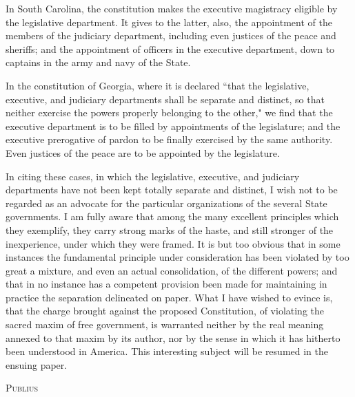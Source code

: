 In South Carolina, the constitution makes the executive magistracy eligible by the legislative department. 
It gives to the latter, also, the appointment of the members of the judiciary department, including even justices of the peace and sheriffs; and the appointment of officers in the executive department, down to captains in the army and navy of the State.

In the constitution of Georgia, where it is declared ``that the legislative, executive, and judiciary departments shall be separate and distinct, so that neither exercise the powers properly belonging to the other," we find that the executive department is to be filled by appointments of the legislature; and the executive prerogative of pardon to be finally exercised by the same authority. 
Even justices of the peace are to be appointed by the legislature.

In citing these cases, in which the legislative, executive, and judiciary departments have not been kept totally separate and distinct, I wish not to be regarded as an advocate for the particular organizations of the several State governments. 
I am fully aware that among the many excellent principles which they exemplify, they carry strong marks of the haste, and still stronger of the inexperience, under which they were framed. 
It is but too obvious that in some instances the fundamental principle under consideration has been violated by too great a mixture, and even an actual consolidation, of the different powers; and that in no instance has a competent provision been made for maintaining in practice the separation delineated on paper. 
What I have wished to evince is, that the charge brought against the proposed Constitution, of violating the sacred maxim of free government, is warranted neither by the real meaning annexed to that maxim by its author, nor by the sense in which it has hitherto been understood in America. 
This interesting subject will be resumed in the ensuing paper.

\vspace{.5cm}
\textsc{Publius}

\vspace{1.5cm}

